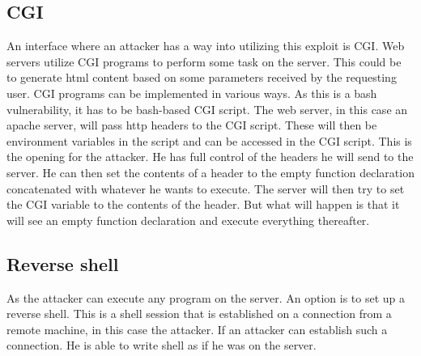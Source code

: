 \subsection*{CGI}
An interface where an attacker has a way into utilizing this exploit is CGI. Web servers utilize CGI programs to perform some task on the server. This could be to generate html content based on some parameters received by the requesting user. CGI programs can be implemented in various ways. As this is a bash vulnerability, it has to be bash-based CGI script. The web server, in this case an apache server, will pass http headers to the CGI script. These will then be environment variables in the script and can be accessed in the CGI script. This is the opening for the attacker. He has full control of the headers he will send to the server. He can then set the contents of a header to the empty function declaration concatenated with whatever he wants to execute. The server will then try to set the CGI variable to the contents of the header. But what will happen is that it will see an empty function declaration and execute everything thereafter.  

\subsection*{Reverse shell}
As the attacker can execute any program on the server. An option is to set up a reverse shell. This is a shell session that is established on a connection from a remote machine, in this case the attacker. If an attacker can establish such a connection. He is able to write shell as if he was on the server. 
